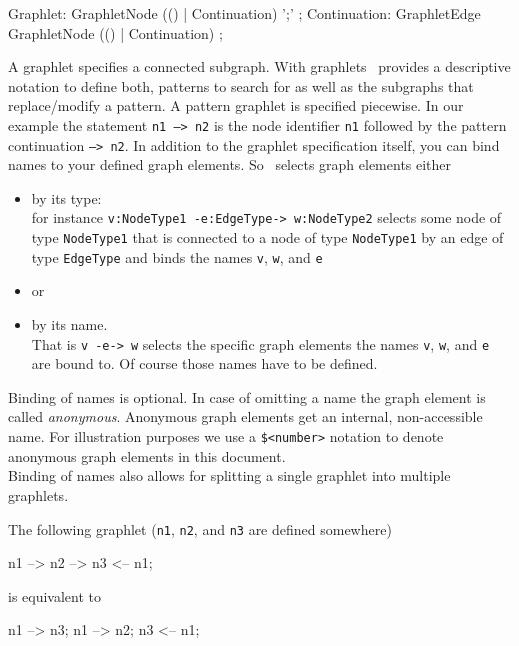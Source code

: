 \begin{rail}
  Graphlet: GraphletNode (() | Continuation) ';' ;
  Continuation: GraphletEdge GraphletNode (() | Continuation) ;
\end{rail}
A graphlet specifies a connected subgraph. With graphlets \GrG\ provides a descriptive notation to define both, patterns to search for as well as the subgraphs that replace/modify a pattern. A pattern graphlet is specified piecewise. In our example the statement \texttt{n1 --> n2} is the node identifier \texttt{n1} followed by the pattern continuation \texttt{--> n2}. In addition to the graphlet specification itself, you can bind names to your defined graph elements. So \GrG\ selects graph elements either
\begin{itemize}
  \item by its type:\\
     for instance \texttt{v:NodeType1 -e:EdgeType-> w:NodeType2} selects some node of type \texttt{Node\-Type1} that is connected to a node of type \texttt{NodeType1} by an edge of type \texttt{EdgeType} and binds the names \texttt{v}, \texttt{w}, and \texttt{e}
   \item[ ] or
   \item by its name. \\
     That is  \texttt{v -e-> w} selects the specific graph elements the names \texttt{v}, \texttt{w}, and \texttt{e} are bound to. Of course those names have to be defined. 
\end{itemize}
Binding of names is optional. In case of omitting a name the graph element is called \emph{anonymous}. Anonymous graph elements get an internal, non-accessible name. For illustration purposes we use a \texttt{\$<number>} notation to denote anonymous graph elements in this document.\\
Binding of names also allows for splitting a single graphlet into multiple graphlets.
\begin{example}
The following graphlet (\texttt{n1}, \texttt{n2}, and \texttt{n3} are defined somewhere)
\begin{grgen}
n1 --> n2 --> n3 <-- n1;
\end{grgen}
is equivalent to
\begin{grgen}
n1 --> n3;
n1 --> n2;
n3 <-- n1;
\end{grgen}
\end{example}

